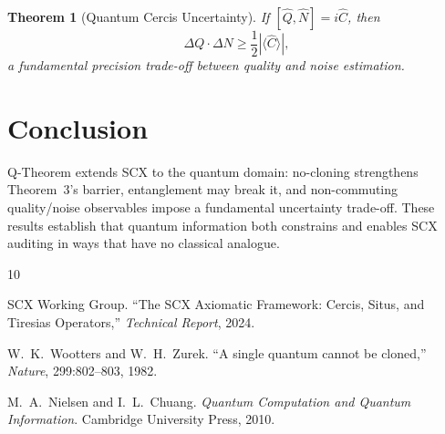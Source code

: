 \documentclass[12pt,a4paper]{article}
\newtheorem{theorem}{Theorem}[section]
\begin{document}
\begin{theorem}[Quantum Cercis Uncertainty]
\label{thm:uncertainty}
If $[\hat{Q},\hat{N}] = i\hat{C}$, then
\[
\Delta Q \cdot \Delta N \geq \frac12 |\langle\hat{C}\rangle|,
\]
a fundamental precision trade-off between quality and noise estimation.
\end{theorem}

\section{Conclusion}

Q-Theorem extends \textsf{SCX} to the quantum domain: no-cloning strengthens Theorem~3's barrier, entanglement may break it, and non-commuting quality/noise observables impose a fundamental uncertainty trade-off. These results establish that quantum information both constrains and enables \textsf{SCX} auditing in ways that have no classical analogue.


\begin{thebibliography}{10}

SCX Working Group.
\newblock ``The \textsf{SCX} Axiomatic Framework: Cercis, Situs, and Tiresias Operators,''
\newblock \emph{Technical Report}, 2024.

W.~K.~Wootters and W.~H.~Zurek.
\newblock ``A single quantum cannot be cloned,''
\newblock \emph{Nature}, 299:802--803, 1982.

M.~A.~Nielsen and I.~L.~Chuang.
\newblock \emph{Quantum Computation and Quantum Information}.
\newblock Cambridge University Press, 2010.

\end{thebibliography}
\end{document}
